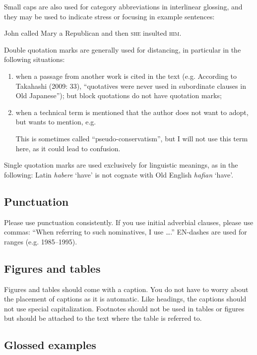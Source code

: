 Small caps are also used for category abbreviations in interlinear glossing, and they may be used to indicate stress or focusing in example sentences:

\ea 
John called Mary a Republican and then \textsc{she} insulted \textsc{him}.
\z

Double quotation marks are generally used for distancing, in particular in the following situations:
\begin{enumerate}
 \item  when a passage from another work is cited in the text (e.g. According to Takahashi (2009: 33), ``quotatives were never used in subordinate clauses in Old Japanese''); but block quotations do not have quotation marks;
  \item when a technical term is mentioned that the author does not want to adopt, but wants to mention, e.g.

  \ea
  This is sometimes called ``pseudo-conservatism'', but I will not use this term here, as it could lead
  to confusion.
  \z

\end{enumerate}


Single quotation marks are used exclusively for linguistic meanings, as in the following:
\ea
Latin \textit{habere} `have' is not cognate with Old English \textit{hafian} `have'.
\z

\subsection{Punctuation}
Please use punctuation consistently. 
If you use initial adverbial clauses, please use commas: ``When referring to such nominatives, I use {\ldots}.''
EN-dashes are used for ranges (e.g. 1985--1995).


\subsection{Figures and tables}

Figures and tables should come with a caption. You do not have to worry about the placement of captions as it is automatic. Like headings, the captions should not use special capitalization.  
Footnotes should not be used in tables or figures but should be attached to the text where the table is referred to.


\subsection{Glossed examples}

